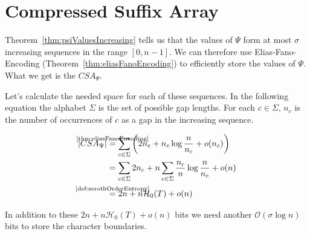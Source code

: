 \section{Compressed Suffix Array}

Theorem~\ref{thm:psiValuesIncreasing} tells us that the values of $\Psi$ form at most $\sigma$ increasing sequences in the range $[0,n-1]$. We can therefore use Elias-Fano-Encoding (Theorem~\ref{thm:eliasFanoEncoding}) to efficiently store the values of $\Psi$. What we get is the  $CSA_\Psi$.

Let's calculate the needed space for each of these sequences. In the following equation the alphabet $\Sigma$ is the set of possible gap lengths. For each $c \in \Sigma$, $n_c$ is the number of occurrences of $c$ as a gap in the increasing sequence.

\begin{align}
  \begin{aligned}
    \vert CSA_\Psi \vert
    &\stackrel{\mathclap{\text{\ref{thm:eliasFanoEncoding}}}}{=}
    \sum_{c \in \Sigma} \left(2n_c + n_c\log\frac{n}{n_c} + o(n_c)\right) \\
    &= \sum_{c \in \Sigma} 2n_c + n\sum_{c \in \Sigma}\frac{n_c}{n}\log\frac{n}{n_c} + o(n) \\
    &\stackrel{\mathclap{\text{\ref{def:zerothOrderEntropy}}}}{=} 2n + n\mathcal{H}_0(T) + o(n)
  \end{aligned}
\end{align}

In addition to these $2n + n\mathcal{H}_0(T) + o(n)$ bits we need another $\mathcal{O}(\sigma\log n)$ bits to store the character boundaries.
